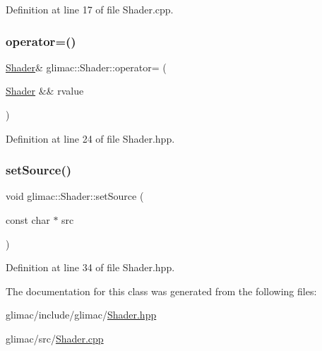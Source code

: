 Definition at line 17 of file Shader.\+cpp.

\mbox{\label{classglimac_1_1_shader_a0790eeb7a9fc154161bee6b78e287828}} 
\subsubsection{\texorpdfstring{operator=()}{operator=()}}
{\footnotesize\ttfamily \hyperlink{classglimac_1_1_shader}{Shader}\& glimac\+::\+Shader\+::operator= (\begin{DoxyParamCaption}\item[{\hyperlink{classglimac_1_1_shader}{Shader} \&\&}]{rvalue }\end{DoxyParamCaption})\hspace{0.3cm}{\ttfamily [inline]}}



Definition at line 24 of file Shader.\+hpp.

\mbox{\label{classglimac_1_1_shader_a66701118e7f1d789a258936c82b32874}} 
\subsubsection{\texorpdfstring{set\+Source()}{setSource()}}
{\footnotesize\ttfamily void glimac\+::\+Shader\+::set\+Source (\begin{DoxyParamCaption}\item[{const char $\ast$}]{src }\end{DoxyParamCaption})\hspace{0.3cm}{\ttfamily [inline]}}



Definition at line 34 of file Shader.\+hpp.



The documentation for this class was generated from the following files\+:\begin{DoxyCompactItemize}
\item 
glimac/include/glimac/\hyperlink{_shader_8hpp}{Shader.\+hpp}\item 
glimac/src/\hyperlink{_shader_8cpp}{Shader.\+cpp}\end{DoxyCompactItemize}
